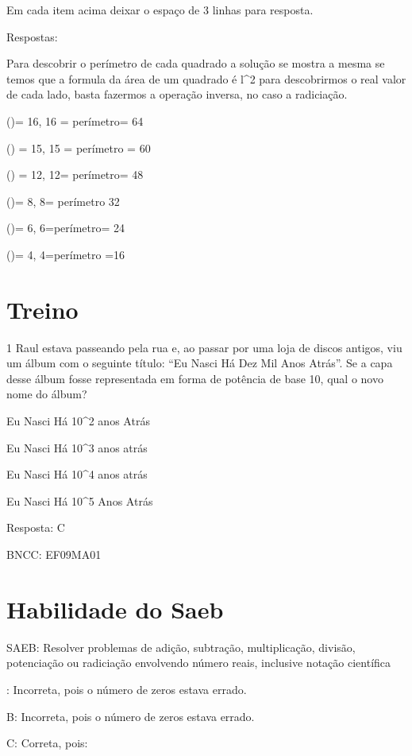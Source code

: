 Em cada item acima deixar o espaço de 3 linhas para resposta.

Respostas:

Para descobrir o perímetro de cada quadrado a solução se mostra a mesma
se temos que a formula da área de um quadrado é l^2 para descobrirmos o
real valor de cada lado, basta fazermos a operação inversa, no caso a
radiciação.

\item ()= 16, 16 = perímetro= 64
\item () = 15, 15 = perímetro = 60
\item () = 12, 12= perímetro= 48
\item ()= 8, 8= perímetro 32
\item ()= 6, 6=perímetro= 24
\item ()= 4, 4=perímetro =16

\section{Treino}

\num{1} Raul estava passeando pela rua e, ao passar por uma loja de discos
antigos, viu um álbum com o seguinte título: ``Eu Nasci Há Dez Mil Anos
Atrás''. Se a capa desse álbum fosse representada em forma de potência
de base 10, qual o novo nome do álbum?

\item Eu Nasci Há 10^2 anos Atrás
\item Eu Nasci Há 10^3 anos atrás
\item Eu Nasci Há 10^4 anos atrás
\item Eu Nasci Há 10^5 Anos Atrás

Resposta: C

BNCC: EF09MA01

\section{Habilidade do Saeb}

SAEB: Resolver problemas de adição, subtração, multiplicação, divisão,
potenciação ou radiciação envolvendo número reais, inclusive notação
científica

: Incorreta, pois o número de zeros estava errado.

B: Incorreta, pois o número de zeros estava errado.

C: Correta, pois:

